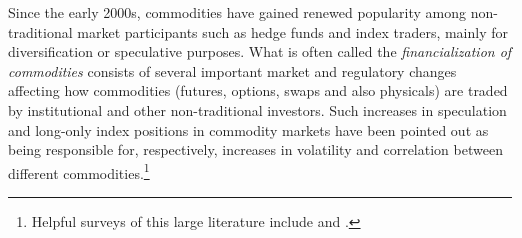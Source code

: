 \documentclass[12pt]{article}
\begin{document}


Since the early 2000s, commodities have gained renewed popularity among non-traditional market participants such as hedge funds and index traders, mainly for diversification or speculative purposes. What is often called the \emph{financialization of commodities} consists of several important market and regulatory changes affecting how commodities (futures, options, swaps and also physicals) are traded by institutional and other non-traditional investors. Such increases in speculation and long-only index positions in commodity markets have been pointed out as being responsible for, respectively, increases in volatility and correlation between different commodities.\footnote{Helpful surveys of this large literature include \citet{boyd2018update} and \citet{cheng2014financialization}.}
\end{document}
